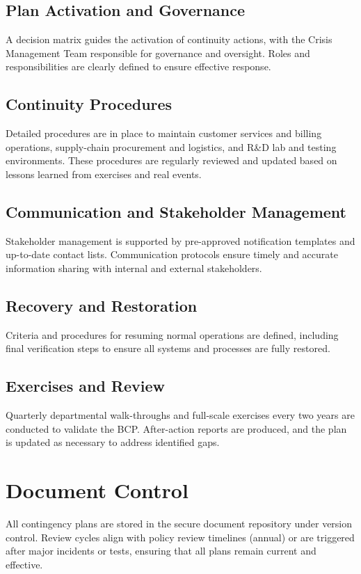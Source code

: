 \subsection{Plan Activation and Governance}
A decision matrix guides the activation of continuity actions, with the Crisis Management Team responsible for governance and oversight. Roles and responsibilities are clearly defined to ensure effective response.

\subsection{Continuity Procedures}
Detailed procedures are in place to maintain customer services and billing operations, supply-chain procurement and logistics, and R\&D lab and testing environments. These procedures are regularly reviewed and updated based on lessons learned from exercises and real events.

\subsection{Communication and Stakeholder Management}
Stakeholder management is supported by pre-approved notification templates and up-to-date contact lists. Communication protocols ensure timely and accurate information sharing with internal and external stakeholders.

\subsection{Recovery and Restoration}
Criteria and procedures for resuming normal operations are defined, including final verification steps to ensure all systems and processes are fully restored.

\subsection{Exercises and Review}
Quarterly departmental walk-throughs and full-scale exercises every two years are conducted to validate the BCP. After-action reports are produced, and the plan is updated as necessary to address identified gaps.

\section{Document Control}
All contingency plans are stored in the secure document repository under version control. Review cycles align with policy review timelines (annual) or are triggered after major incidents or tests, ensuring that all plans remain current and effective.
